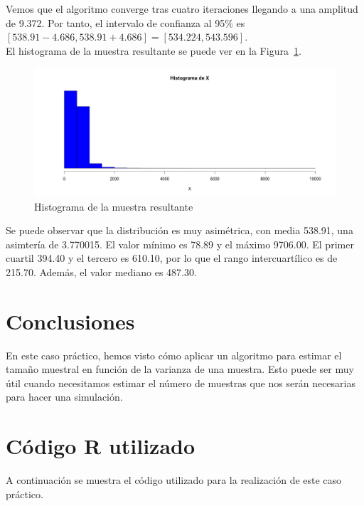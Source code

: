 \documentclass[12pt,a4paper,twoside,openright,titlepage,final]{article}
\begin{document}
Vemos que el algoritmo converge tras cuatro iteraciones llegando a una amplitud de 9.372. Por tanto, el intervalo de confianza al 95\% es $[538.91 - 4.686, 538.91 + 4.686] = [534.224, 543.596]$.\\

El histograma de la muestra resultante se puede ver en la Figura~\ref{fig:histograma}.\\

\begin{figure}[tbph!]
\centering
\includegraphics[width=0.8\linewidth]{"imagenes/histograma"}
\caption{Histograma de la muestra resultante}
\label{fig:histograma}
\end{figure}
 
Se puede observar que la distribución es muy asimétrica, con media 538.91, una asimtería de 3.770015. El valor mínimo es 78.89 y el máximo 9706.00. El primer cuartil 394.40 y el tercero es 610.10, por lo que el rango intercuartílico es de 215.70. Además, el valor mediano es 487.30.  

\section{Conclusiones}

En este caso práctico, hemos visto cómo aplicar un algoritmo para estimar el tamaño muestral en función de la varianza de una muestra. Esto puede ser muy útil cuando necesitamos estimar el número de muestras que nos serán necesarias para hacer una simulación.

\newpage

\section{Código R utilizado}

A continuación se muestra el código utilizado para la realización de este caso práctico.

\inputminted{r}{../codigo/caso_iv.R}
\end{document}
